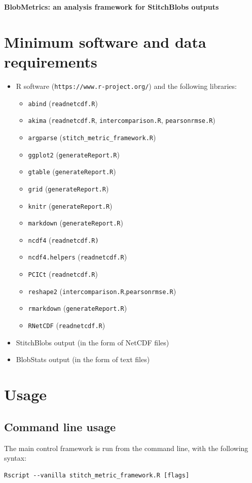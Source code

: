 \documentclass{article}
\begin{document}
{\Huge \textbf{BlobMetrics: an analysis framework for StitchBlobs outputs}}
\tableofcontents

\pagebreak

\section{Minimum software and data requirements}
\begin{itemize}
\item R software (\texttt{https://www.r-project.org/}) and the following libraries:
\begin{itemize}
\item \texttt{abind} (\texttt{readnetcdf.R})
\item \texttt{akima} (\texttt{readnetcdf.R}, \texttt{intercomparison.R}, \texttt{pearsonrmse.R})
\item \texttt{argparse} (\texttt{stitch\_metric\_framework.R})
\item \texttt{ggplot2} (\texttt{generateReport.R})
\item \texttt{gtable} (\texttt{generateReport.R})
\item \texttt{grid} (\texttt{generateReport.R})
\item \texttt{knitr} (\texttt{generateReport.R})
\item \texttt{markdown} (\texttt{generateReport.R})
\item \texttt{ncdf4} (\texttt{readnetcdf.R)}
\item \texttt{ncdf4.helpers} (\texttt{readnetcdf.R})
\item \texttt{PCICt} (\texttt{readnetcdf.R})
\item \texttt{reshape2} (\texttt{intercomparison.R},\texttt{pearsonrmse.R})
\item \texttt{rmarkdown} (\texttt{generateReport.R})
\item \texttt{RNetCDF} (\texttt{readnetcdf.R})
\end{itemize}
\item StitchBlobs output (in the form of NetCDF files)
\item BlobStats output (in the form of text files)
\end{itemize}



\section{Usage}
\subsection{Command line usage}
The main control framework is run from the command line, with the following syntax:
\begin{verbatim}
Rscript --vanilla stitch_metric_framework.R [flags]
\end{verbatim}
\end{document}
